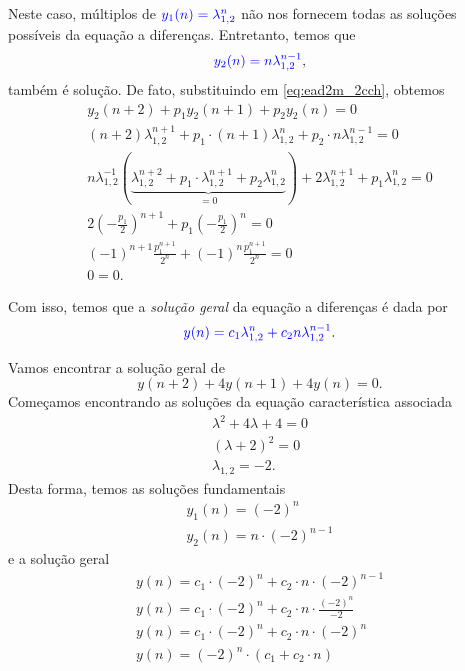 Neste caso, múltiplos de ${\color{blue}y_1(n) = \lambda^n_{1,2}}$ não nos fornecem todas as soluções possíveis da equação a diferenças. Entretanto, temos que
\begin{equation}
  {\color{blue}y_2(n) = n\lambda_{1,2}^{n-1}},
\end{equation}
também é solução. De fato, substituindo em \eqref{eq:ead2m_2cch}, obtemos
\begin{gather}
  y_2(n+2) + p_1y_2(n+1) + p_2y_2(n) = 0\\
  (n+2)\lambda_{1,2}^{n+1} + p_1\cdot(n+1)\lambda_{1,2}^n + p_2\cdot n\lambda_{1,2}^{n-1} = 0\\
  n\lambda_{1,2}^{-1}\left(\underbrace{\lambda_{1,2}^{n+2}+p_1\cdot\lambda_{1,2}^{n+1}+p_2\lambda_{1,2}^n}_{=0}\right) + 2\lambda_{1,2}^{n+1}+p_1\lambda_{1,2}^n = 0\\
  2\left(-\frac{p_1}{2}\right)^{n+1}+p_1\left(-\frac{p_1}{2}\right)^n = 0\\
  (-1)^{n+1}\frac{p_1^{n+1}}{2^n} + (-1)^n\frac{p_1^{n+1}}{2^n} = 0\\
  0 = 0.
\end{gather}

Com isso, temos que a \emph{solução geral} da equação a diferenças é dada por
\begin{equation}
  {\color{blue}y(n) = c_1\lambda_{1,2}^n + c_2n\lambda_{1,2}^{n-1}}.
\end{equation}

\begin{ex}
  Vamos encontrar a solução geral de
  \begin{equation}
    y(n+2)+4y(n+1)+4y(n)=0.
  \end{equation}
  Começamos encontrando as soluções da equação característica associada
  \begin{gather}
    \lambda^2 + 4\lambda + 4 = 0\\
    (\lambda+2)^2 = 0 \\
    \lambda_{1,2} = -2.
  \end{gather}
  Desta forma, temos as soluções fundamentais
  \begin{align}
    y_1(n) = (-2)^n\\
    y_2(n) = n\cdot (-2)^{n-1}
  \end{align}
  e a solução geral
  \begin{gather}
    y(n) = c_1\cdot (-2)^n + c_2\cdot n\cdot (-2)^{n-1}\\
    y(n) = c_1\cdot (-2)^n + c_2\cdot n\cdot \frac{(-2)^n}{-2}\\
    y(n) = c_1\cdot(-2)^n + c_2\cdot n \cdot (-2)^n\\
    y(n) = (-2)^n\cdot \left(c_1 + c_2\cdot n\right)
  \end{gather}
\end{ex}

